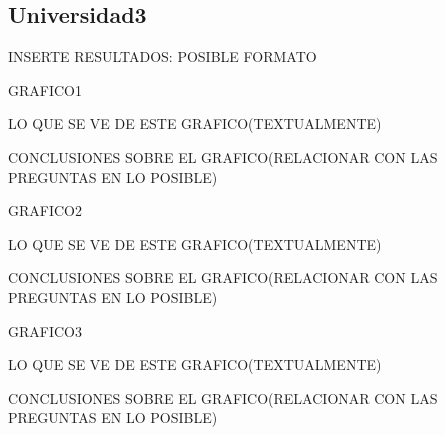 \subsection{Universidad3}

INSERTE RESULTADOS: POSIBLE FORMATO

GRAFICO1

LO QUE SE VE DE ESTE GRAFICO(TEXTUALMENTE)

CONCLUSIONES SOBRE EL GRAFICO(RELACIONAR CON LAS PREGUNTAS EN LO POSIBLE)


GRAFICO2

LO QUE SE VE DE ESTE GRAFICO(TEXTUALMENTE)

CONCLUSIONES SOBRE EL GRAFICO(RELACIONAR CON LAS PREGUNTAS EN LO POSIBLE)


GRAFICO3

LO QUE SE VE DE ESTE GRAFICO(TEXTUALMENTE)

CONCLUSIONES SOBRE EL GRAFICO(RELACIONAR CON LAS PREGUNTAS EN LO POSIBLE)